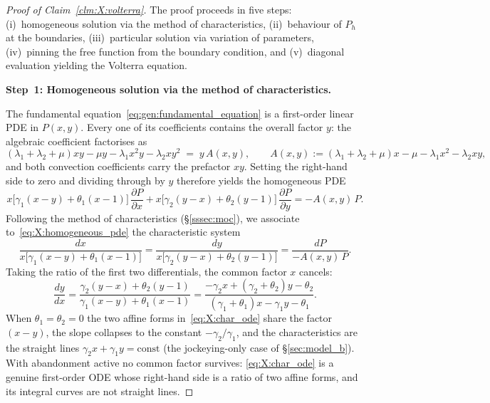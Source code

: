 \begin{proof}[Proof of Claim~\ref{clm:X:volterra}]
The proof proceeds in five steps: (i)~homogeneous solution via the method of
characteristics, (ii)~behaviour of $P_h$ at the boundaries, (iii)~particular solution
via variation of parameters, (iv)~pinning the free function from the boundary condition,
and (v)~diagonal evaluation yielding the Volterra equation.

\medskip\noindent\textbf{Step~1: Homogeneous solution via the method of characteristics.}

The fundamental equation~\eqref{eq:gen:fundamental_equation} is a first-order linear PDE
in $P(x,y)$. Every one of its coefficients contains the overall factor $y$: the
algebraic coefficient factorises as
\begin{equation}
    (\lambda_1+\lambda_2+\mu)xy - \mu y - \lambda_1 x^2 y - \lambda_2 x y^2
    \;=\; y\,A(x,y),
    \qquad
    A(x,y) := (\lambda_1+\lambda_2+\mu)x - \mu - \lambda_1 x^2 - \lambda_2 xy,
    \label{eq:X:Adef}
\end{equation}
and both convection coefficients carry the prefactor $xy$. Setting the right-hand side
to zero and dividing through by $y$ therefore yields the homogeneous PDE
\begin{equation}
    x\bigl[\gamma_1(x-y)+\theta_1(x-1)\bigr]\,\frac{\partial P}{\partial x}
    + x\bigl[\gamma_2(y-x)+\theta_2(y-1)\bigr]\,\frac{\partial P}{\partial y}
    = -A(x,y)\,P.
    \label{eq:X:homogeneous_pde}
\end{equation}
Following the method of characteristics
(\S\ref{sssec:moc}), we associate to~\eqref{eq:X:homogeneous_pde} the characteristic
system
\begin{equation}
    \frac{dx}{x\bigl[\gamma_1(x-y)+\theta_1(x-1)\bigr]}
    = \frac{dy}{x\bigl[\gamma_2(y-x)+\theta_2(y-1)\bigr]}
    = \frac{dP}{-A(x,y)\,P}.
    \label{eq:X:char_system}
\end{equation}
Taking the ratio of the first two differentials, the common factor $x$ cancels:
\begin{equation}
    \frac{dy}{dx}
    = \frac{\gamma_2(y-x)+\theta_2(y-1)}{\gamma_1(x-y)+\theta_1(x-1)}
    = \frac{-\gamma_2 x + (\gamma_2+\theta_2)y - \theta_2}
           {(\gamma_1+\theta_1)x - \gamma_1 y - \theta_1}.
    \label{eq:X:char_ode}
\end{equation}
When $\theta_1=\theta_2=0$ the two affine forms in~\eqref{eq:X:char_ode} share the
factor $(x-y)$, the slope collapses to the constant $-\gamma_2/\gamma_1$, and the
characteristics are the straight lines $\gamma_2 x+\gamma_1 y=\mathrm{const}$ (the
jockeying-only case of \S\ref{sec:model_b}). With abandonment active no common factor
survives: \eqref{eq:X:char_ode} is a genuine first-order ODE whose right-hand side is a
ratio of two affine forms, and its integral curves are not straight lines.


\end{proof}

